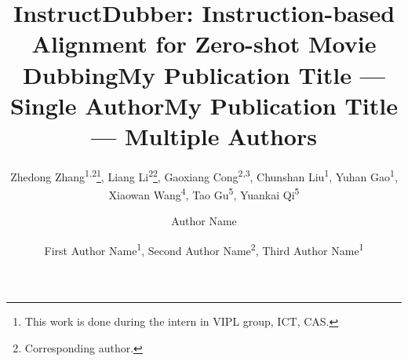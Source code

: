 \documentclass[letterpaper]{article} %
\title{InstructDubber: Instruction-based Alignment for Zero-shot Movie Dubbing}
\author{
    Zhedong Zhang\textsuperscript{\rm 1,2}\footnote{This work is done during the intern in VIPL group, ICT, CAS.}, Liang Li\textsuperscript{\rm 2}\thanks{Corresponding author.}, Gaoxiang Cong\textsuperscript{\rm 2,3}, Chunshan Liu\textsuperscript{\rm 1}, Yuhan Gao\textsuperscript{\rm 1}, \\ 
    Xiaowan Wang\textsuperscript{\rm 4}, Tao Gu\textsuperscript{\rm 5}, Yuankai Qi\textsuperscript{\rm 5}
}
\title{My Publication Title --- Single Author}
\author {
    Author Name
}
\title{My Publication Title --- Multiple Authors}
\author {
    First Author Name\textsuperscript{\rm 1},
    Second Author Name\textsuperscript{\rm 2},
    Third Author Name\textsuperscript{\rm 1}
}
\begin{document}
\def\eg{\emph{e.g.}} 
\def\Eg{\emph{E.g.}}
\def\vs{\emph{v.s.}} 
\def\ie{\emph{i.e.}} 
\def\Ie{\emph{I.e.}}
\def\etc{\emph{etc.}} 
\def\wrt{\emph{w.r.t.}} 
\def\etal{\emph{et al.}}


\maketitle



\begin{links}
\end{links}










% 
% 
% 
\end{document}
